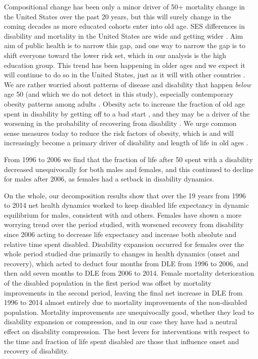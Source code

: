 Compositional change has been only a minor driver of 50+ mortality change in the United States over the past 20 years, but this will surely change in the coming decades as more educated cohorts enter into old age. SES differences in disability and mortality in the United States are wide and getting wider \citep{montez2014cumulative}. Aim aim of public health is to narrow this gap, and one way to narrow the gap is to shift everyone toward the lower risk set, which in our analysis is the high education group. This trend has been happening in older ages and we expect it will continue to do so in the United States, just as it will with other countries \citep{kc2010projection}. We are rather worried about patterns of disease and disability that happen \emph{below} age 50 (and which we do not detect in this study), especially contemporary obesity patterns among adults \citep{flegal2012prevalence}. Obesity acts to increase the fraction of old age spent in disability by getting off to a bad start \citep{alley2007changing}, and they may be a driver of the worsening in the probability of recovering from disability \citep[c.f.,][]{walter2009mortality}. We urge common sense measures today to reduce the risk factors of obesity, which is and will increasingly become a primary driver of disability and length of life in old ages \citep{mehta2017population}.

From 1996 to 2006 we find that the fraction of life after 50 spent with a disability decreased unequivocally for both males and females, and this continued to decline for males after 2006, as females had a setback in disability dynamics. 

On the whole, our decomposition results show that over the 19 years from 1996 to 2014 net health dynamics worked to keep disabled life expectancy in dynamic equilibrium for males, consistent with \citet{manton1982changing} and others. Females have shown a more worrying trend over the period studied, with worsened recovery from disability since 2006 acting to decrease life expectancy and increase both absolute and relative time spent disabled. Disability expansion occurred for females over the whole period studied due primarily to changes in health dynamics (onset and recovery), which acted to deduct four months from DLE from 1996 to 2006, and then add seven months to DLE from 2006 to 2014. Female mortality deterioration of the disabled population in the first period was offset by mortality improvements in the second period, leaving the final net increase in DLE from 1996 to 2014 almost entirely due to mortality improvements of the non-disabled population. Mortality improvements are unequivocally good, whether they lead to disability expansion or compression, and in our case they have had a neutral effect on disability compression. The best levers for interventions with respect to the time and fraction of life spent disabled are those that influence onset and recovery of disability.

